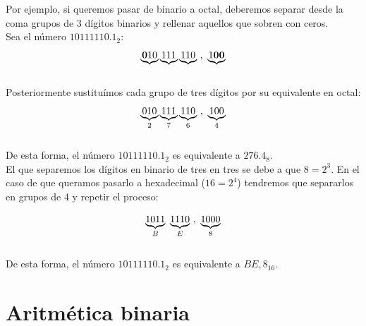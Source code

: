 \documentclass[12pt]{article}
\begin{document}
				Por ejemplo, si queremos pasar de binario a octal, deberemos separar desde la coma grupos de 3 dígitos binarios y rellenar aquellos que sobren con ceros.\\
				
				Sea el número $10 111 110.1_2$:\\
				
				\begin{equation}
					\notag
					\underbrace{\textbf{0}10} \underbrace{111} \underbrace{110} ~,~ \underbrace{1\textbf{0}\textbf{0}}
				\end{equation}\\
				
				Posteriormente sustituímos cada grupo de tres dígitos por su equivalente en octal:\\
				
				\begin{equation}
					\notag
					\underbrace{010}_2 \underbrace{111}_7 \underbrace{110}_6 ~,~ \underbrace{100}_4
				\end{equation}\\
				
				De esta forma, el número $10111110.1_2$ es equivalente a $276.4_8$.\\
				
				El que separemos los dígitos en binario de tres en tres se debe a que $8 = 2^3$. En el caso de que queramos pasarlo a hexadecimal ($16 = 2^4$) tendremos que separarlos en grupos de 4 y repetir el proceso:
				
				\begin{equation}
					\notag
					\underbrace{1011}_B ~ \underbrace{1110}_E ~,~ \underbrace{1000}_8
				\end{equation}\\
				
				De esta forma, el número $10111110.1_2$ es equivalente a $BE,8_{16}$.\\
				
				\newpage
				
		\section{Aritmética binaria}
				
\end{document}
